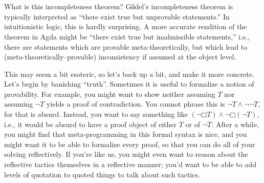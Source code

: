 \begin{code}
\\
\>  \AgdaSymbol{=} \<%
\\
%
\\
\> \<%
\\
\> \<%
\\
\>  \AgdaSymbol{:}  \<%
\\
\>  \AgdaSymbol{=} \<%
\\
%
\\
\> \<%
\\
\> \<%
\\
\> \<%
\\
\>  \AgdaSymbol{:}   \AgdaSymbol{\{}\AgdaSymbol{\}}   \AgdaSymbol{(}   \AgdaSymbol{))}\<%
\\
\>   \AgdaSymbol{=}  \AgdaSymbol{(} \AgdaSymbol{\{}\AgdaSymbol{\})}\<%
\end{code}

  What is this incompleteness theorem?  Gӧdel's incompleteness theorem
  is typically interpreted as ``there exist true but unprovable
  statements.''  In intuitionistic logic, this is hardly surprising.
  A more accurate rendition of the theorem in Agda might be ``there
  exist true but inadmissible statements,'' i.e., there are statements
  which are provable meta-theoretically, but which lead to
  (meta-theoretically--provable) inconsistency if assumed at the
  object level.

  This may seem a bit esoteric, so let's back up a bit, and make it
  more concrete.  Let's begin by banishing ``truth''.  Sometimes it is
  useful to formalize a notion of provability.  For example, you might
  want to show neither assuming $T$ nor assuming $¬T$ yields a proof
  of contradiction.  You cannot phrase this is $¬T ∧ ¬¬T$, for that is
  absurd.  Instead, you want to say something like $(¬□T) ∧ ¬□(¬T)$,
  i.e., it would be absurd to have a proof object of either $T$ or of
  $¬T$.  After a while, you might find that meta-programming in this
  formal syntax is nice, and you might want it to be able to formalize
  every proof, so that you can do all of your solving reflectively.
  If you're like us, you might even want to reason about the
  reflective tactics themselves in a reflective manner; you'd want to
  be able to add levels of quotation to quoted things to talk about
  such tactics.

